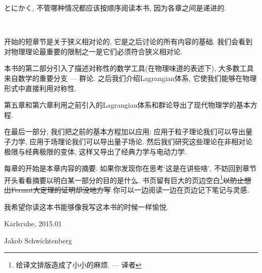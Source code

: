 とにかく, 不管哪种情况都应该按顺序阅读本书, 因为各章之间是递进的.

\ 

开始的短章节是关于狭义相对论的, 它是之后讨论的所有内容的基础. 我们会看到对物理理论最重要的限制之一是它们必须符合狭义相对论. 

本书的第二部分引入了描述对称性的数学工具(在物理味道的表述下), 大多数工具来自数学的重要分支 --- 群论. 之后我们介绍Lagrangian体系, 它使我们能够在物理形式中直接利用对称性. 

第五章和第六章利用之前引入的Lagrangian体系和群论导出了现代物理学的基本方程. 

在最后一部分, 我们把之前的基本方程加以应用: %
应用于粒子理论我们可以导出量子力学, 应用于场理论我们可以导出量子场论. 然后我们研究这些理论在非相对论极限与经典极限的变体, 这样又导出了经典力学与电动力学.

每章的开始是本章内容的摘要. 如果你发现你在思考`这是在讲些啥', 不妨回到章节开头看看摘要以明白某一部分的目的是什么. 书页留有巨大的页边空白\footnote{给译文排版造成了小小的麻烦. --- 译者}\sout{以防止想出Fermat大定理的证明却没地方写}
你可以一边阅读一边在页边记下笔记与灵感.

我希望你读这本书能够像我写这本书的时候一样愉悦.

\begin{flushright}
Karlsruhe, 2015.01

Jakob Schwichtenberg
\end{flushright}







